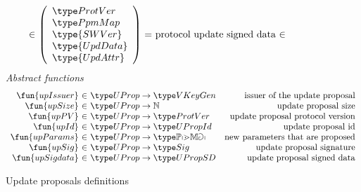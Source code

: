 \begin{figure}[htb]
\begin{equation*}
\begin{array}{r@{~\in~}l@{~=~}r@{~\in~}lr}
      & {
        \left(
        \begin{array}{l}
          \ProtVer\\
          \PPMMap\\
          \type{SWVer}\\
          \type{UpdData}\\
          \type{UpdAttr}\\
        \end{array}
                   \right)
                   }
               & \text{protocol update signed data}
    \end{array}
  \end{equation*}
  \emph{Abstract functions}
  \begin{equation*}
    \begin{array}{r@{~\in~}lr}
      \fun{upIssuer} & \UProp \to \VKeyGen & \text{issuer of the update proposal}\\
      \fun{upSize} & \UProp \to \mathbb{N} & \text{update proposal size}\\
      \fun{upPV} & \UProp \to \ProtVer & \text{update proposal protocol version}\\
      \fun{upId} & \UProp \to \UPropId & \text{update proposal id}\\
      \fun{upParams} & \UProp \to \mathbb{\PPMMap}
                                           & \text{new parameters that are proposed}\\
      \fun{upSig} & \UProp \to \Sig & \text{update proposal signature}\\
      \fun{upSigdata} & \UProp \to \UPropSD & \text{update proposal signed data}
    \end{array}
  \end{equation*}
  \caption{Update proposals definitions}
  \label{fig:defs:update-proposals}
\end{figure}

